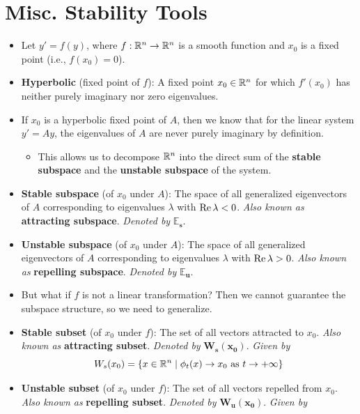 \documentclass[../notes.tex]{subfiles}
\begin{document}
\section{Misc. Stability Tools}
\begin{itemize}
    \item {}Let $y'=f(y)$, where $f:\mathbb{R}^n\to\mathbb{R}^n$ is a smooth function and $x_0$ is a fixed point (i.e., $f(x_0)=0$).
    \item \textbf{Hyperbolic} (fixed point of $f$): A fixed point $x_0\in\mathbb{R}^n$ for which $f'(x_0)$ has neither purely imaginary nor zero eigenvalues.
    \item If $x_0$ is a hyperbolic fixed point of $A$, then we know that for the linear system $y'=Ay$, the eigenvalues of $A$ are never purely imaginary by definition.
    \begin{itemize}
        \item This allows us to decompose $\mathbb{R}^n$ into the direct sum of the \textbf{stable subspace} and the \textbf{unstable subspace} of the system.
    \end{itemize}
    \item \textbf{Stable subspace} (of $x_0$ under $A$): The space of all generalized eigenvectors of $A$ corresponding to eigenvalues $\lambda$ with $\operatorname{Re}\lambda<0$. \emph{Also known as} \textbf{attracting subspace}. \emph{Denoted by} $\bm{\pmb{\mathbb{E}}_s}$.
    \item \textbf{Unstable subspace} (of $x_0$ under $A$): The space of all generalized eigenvectors of $A$ corresponding to eigenvalues $\lambda$ with $\operatorname{Re}\lambda>0$. \emph{Also known as} \textbf{repelling subspace}. \emph{Denoted by} $\bm{\pmb{\mathbb{E}}_u}$.
    \item But what if $f$ is not a linear transformation? Then we cannot guarantee the subspace structure, so we need to generalize.
    \item \textbf{Stable subset} (of $x_0$ under $f$): The set of all vectors attracted to $x_0$. \emph{Also known as} \textbf{attracting subset}. \emph{Denoted by} $\bm{W_s(x_0)}$. \emph{Given by}
    \begin{equation*}
        W_s(x_0) = \{x\in\mathbb{R}^n\mid\phi_t(x)\to x_0\text{ as }t\to +\infty\}
    \end{equation*}
    \item \textbf{Unstable subset} (of $x_0$ under $f$): The set of all vectors repelled from $x_0$. \emph{Also known as} \textbf{repelling subset}. \emph{Denoted by} $\bm{W_u(x_0)}$. \emph{Given by}
    \begin{equation*}

\end{equation*}
\end{itemize}
\end{document}
